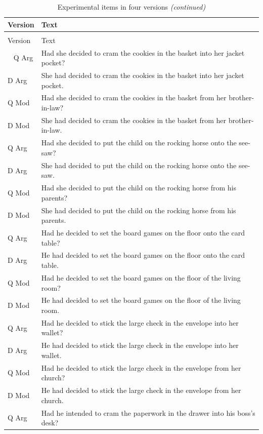 \documentclass[12pt,oneside]{book}
\begin{document}
\begin{longtable}{ll}
\caption{\label{tab:unnamed-chunk-1}Experimental items in four versions}\\
\toprule
Version & Text\\
\midrule
\endfirsthead
\caption[]{\label{tab:unnamed-chunk-1}Experimental items in four versions \textit{(continued)}}\\
\toprule
Version & Text\\
\midrule
\endhead
\
\endfoot
\bottomrule
\endlastfoot
Q Arg & Had she decided to cram the cookies in the basket into her jacket pocket?\\
D Arg & She had decided to cram the cookies in the basket into her jacket pocket.\\
Q Mod & Had she decided to cram the cookies in the basket from her brother-in-law?\\
D Mod & She had decided to cram the cookies in the basket from her brother-in-law.\\
\addlinespace
Q Arg & Had she decided to put the child on the rocking horse onto the see-saw?\\
D Arg & She had decided to put the child on the rocking horse onto the see-saw.\\
Q Mod & Had she decided to put the child on the rocking horse from his parents?\\
D Mod & She had decided to put the child on the rocking horse from his parents.\\
\addlinespace
Q Arg & Had he decided to set the board games on the floor onto the card table?\\
D Arg & He had decided to set the board games on the floor onto the card table.\\
Q Mod & Had he decided to set the board games on the floor of the living room?\\
D Mod & He had decided to set the board games on the floor of the living room.\\
\addlinespace
Q Arg & Had he decided to stick the large check in the envelope into her wallet?\\
D Arg & He had decided to stick the large check in the envelope into her wallet.\\
Q Mod & Had he decided to stick the large check in the envelope from her church?\\
D Mod & He had decided to stick the large check in the envelope from her church.\\
\addlinespace
Q Arg & Had he intended to cram the paperwork in the drawer into his boss's desk?\\

\end{longtable}
\end{document}
